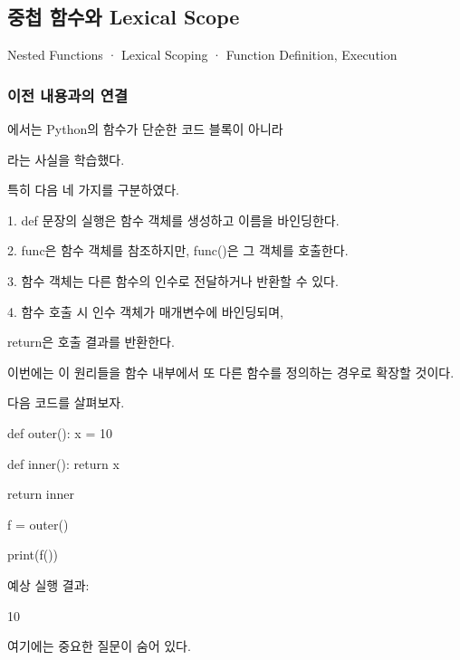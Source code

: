 

\subsection{중첩 함수와 Lexical Scope}

Nested Functions · Lexical Scoping · Function Definition, Execution

\subsubsection{이전 내용과의 연결}

에서는 Python의 함수가 단순한 코드 블록이 아니라

라는 사실을 학습했다.

특히 다음 네 가지를 구분하였다.

\begin{dhksmry}
    1. def 문장의 실행은 함수 객체를 생성하고 이름을 바인딩한다.

    2. func은 함수 객체를 참조하지만, func()은 그 객체를 호출한다.

    3. 함수 객체는 다른 함수의 인수로 전달하거나 반환할 수 있다.

    4. 함수 호출 시 인수 객체가 매개변수에 바인딩되며, 
    
       return은 호출 결과를 반환한다.
\end{dhksmry}

이번에는 이 원리들을 함수 내부에서 또 다른 함수를 정의하는 경우로 확장할 것이다.

다음 코드를 살펴보자.

\begin{dhkcode}
def outer():
    x = 10

    def inner():
        return x

    return inner

f = outer()

print(f())
\end{dhkcode}

예상 실행 결과:

\begin{dhkzsh}
10
\end{dhkzsh}

여기에는 중요한 질문이 숨어 있다.

